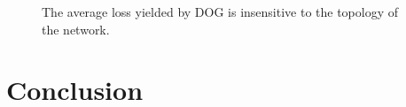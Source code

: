 \documentclass{article}
\begin{document}
\begin{figure}[!h]
\caption{The average loss yielded by DOG is insensitive to the topology of the network.}
\label{figure_compare_topology}
\end{figure}




\section{Conclusion}






\end{document}
